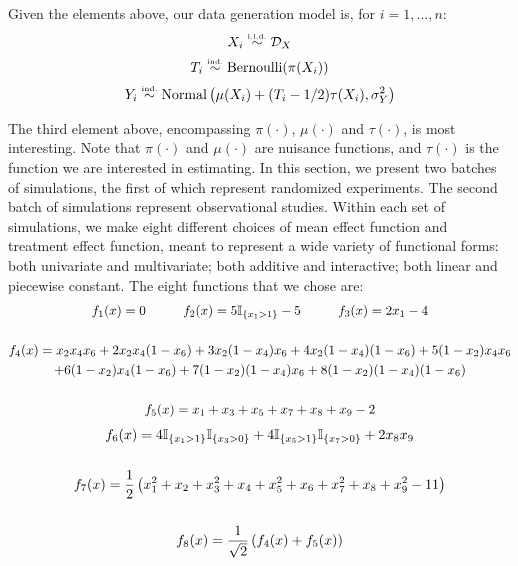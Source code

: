 \documentclass{article}
\def\D{\mathcal{D}}\def\F{\mathcal{F}}\def\K{\mathcal{K}}\def\N{\mathcal{N}}
\def\iid{\stackrel{\mbox{\tiny i.i.d.}}{\sim}}
\def\ind{\stackrel{\mbox{\tiny ind.}}{\sim}}
\def\l{\left}\def\r{\right}\def\lf{\lfloor}\def\rf{\rfloor}
\begin{document}
Given the elements above, our data generation model is, for $i = 1, ..., n$:
$$X_i \iid \D_X$$
$$T_i \ind \mbox{Bernoulli}(\pi(X_i))$$
$$Y_i \ind \mbox{Normal}\l(\mu(X_i) + (T_i - 1/2)\tau(X_i), \sigma^2_Y\r)$$

The third element above, encompassing $\pi(\cdot)$, $\mu(\cdot)$ and
$\tau(\cdot)$, is most interesting. Note that $\pi(\cdot)$ and $\mu(\cdot)$ are
nuisance functions, and $\tau(\cdot)$ is the function we are interested in
estimating. In this section, we present two batches of simulations, the
first of which represent randomized experiments. The second batch of
simulations represent observational studies. Within each set of simulations,
we make eight different choices of mean effect function and treatment effect
function, meant to represent a wide variety of functional forms: both
univariate and multivariate; both additive and interactive; both linear and
piecewise constant. The eight functions that we chose are:
\begin{gather*}
  f_1(x) = 0 \hspace{1cm} f_2(x) = 5\mathbb{I}_{\{x_1 > 1\}} - 5 \hspace{1cm}
    f_3(x) = 2x_1 - 4\\~\\
  f_4(x) = x_2x_4x_6 + 2x_2x_4(1-x_6) + 3x_2(1-x_4)x_6 + 4x_2(1-x_4)(1-x_6)
    + 5(1-x_2)x_4x_6\\
    + 6(1-x_2)x_4(1-x_6) + 7(1-x_2)(1-x_4)x_6 + 8(1-x_2)(1-x_4)(1-x_6)\\~\\
  f_5(x) = x_1 + x_3 + x_5 + x_7 + x_8 + x_9 - 2
\end{gather*}
\begin{gather*}
  f_6(x) = 4\mI_{\{x_1 > 1\}}\mI_{\{x_3 > 0\}} +
    4\mI_{\{x_5 > 1\}}\mI_{\{x_7 > 0\}} + 2x_8x_9\\~\\
  f_7(x) = \frac12\l(x_1^2 + x_2 + x_3^2 + x_4 + x_5^2 + x_6 + x_7^2 + x_8 +
    x_9^2 - 11\r)\\~\\
  f_8(x) = \frac1{\sqrt 2}\l(f_4(x) + f_5(x)\r)
\end{gather*}
\end{document}
